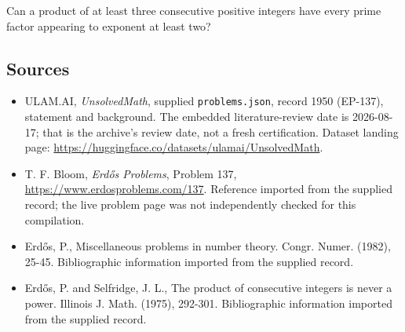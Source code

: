 \documentclass[11pt,a4paper]{article}
\begin{document}
Can a product of at least three consecutive positive integers have every prime factor appearing to exponent at least two?

\subsection{Sources}

{\small

\begin{itemize}

\item[\hypertarget{source:1950:1}{S1}] ULAM.AI, \emph{UnsolvedMath}, supplied \texttt{problems.json}, record 1950 (EP-137), statement and background. The embedded literature-review date is 2026-08-17; that is the archive’s review date, not a fresh certification. Dataset landing page: \url{https://huggingface.co/datasets/ulamai/UnsolvedMath}.

\item[\hypertarget{source:1950:2}{S2}] T. F. Bloom, \emph{Erdős Problems}, Problem 137, \url{https://www.erdosproblems.com/137}. Reference imported from the supplied record; the live problem page was not independently checked for this compilation.

\item[\hypertarget{source:1950:3}{S3}] Erd\H{o}s, P., Miscellaneous problems in number theory. Congr. Numer. (1982), 25-45. Bibliographic information imported from the supplied record.

\item[\hypertarget{source:1950:4}{S4}] Erd\H{o}s, P. and Selfridge, J. L., The product of consecutive integers is never a power. Illinois J. Math. (1975), 292-301. Bibliographic information imported from the supplied record.

\end{itemize}

}

\label{end:1950}
\end{document}
